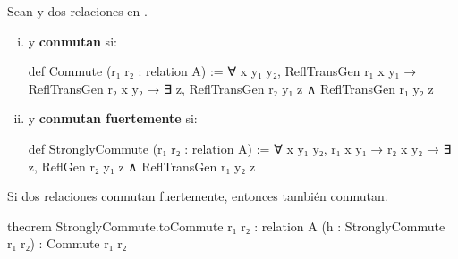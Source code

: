 \begin{defn}
Sean  y  dos relaciones en .

\begin{enumerate}[(i)]

\item {} y  \textbf{conmutan} si:

\begin{center}
\end{center}

\begin{leancode}
def Commute (r₁ r₂ : relation A) := 
  ∀ {x y₁ y₂}, ReflTransGen r₁ x y₁ → ReflTransGen r₂ x y₂ → 
    ∃ z, ReflTransGen r₂ y₁ z ∧ ReflTransGen r₁ y₂ z
\end{leancode}


\item {} y  \textbf{conmutan fuertemente} si:

\begin{center}
\end{center}

\begin{leancode}
def StronglyCommute (r₁ r₂ : relation A) :=
  ∀ {x y₁ y₂}, r₁ x y₁ → r₂ x y₂ → ∃ z, ReflGen r₂ y₁ z ∧ ReflTransGen r₁ y₂ z
\end{leancode}

\end{enumerate}

\end{defn}

\begin{thm}
Si dos relaciones conmutan fuertemente, entonces también conmutan.
\begin{leancode}
theorem StronglyCommute.toCommute {r₁ r₂ : relation A} (h : StronglyCommute r₁ r₂) : 
  Commute r₁ r₂ 
\end{leancode}
\end{thm}

